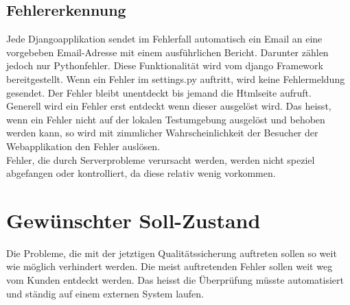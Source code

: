 \subsection{Fehlererkennung}
Jede Djangoapplikation sendet im Fehlerfall automatisch ein Email an eine vorgebeben Email-Adresse mit einem ausführlichen Bericht. Darunter zählen jedoch nur Pythonfehler. Diese Funktionalität wird vom django Framework bereitgestellt. Wenn ein Fehler im settings.py auftritt, wird keine Fehlermeldung gesendet. Der Fehler bleibt unentdeckt bis jemand die Htmlseite aufruft. \\
Generell wird ein Fehler erst entdeckt wenn dieser ausgelöst wird. Das heisst, wenn ein Fehler nicht auf der lokalen Testumgebung ausgelöst und behoben werden kann, so wird mit zimmlicher Wahrscheinlichkeit der Besucher der Webapplikation den Fehler auslösen. \\
Fehler, die durch Serverprobleme verursacht werden, werden nicht speziel abgefangen oder kontrolliert, da diese relativ wenig vorkommen. 

\section{Gewünschter Soll-Zustand}
Die Probleme, die mit der jetztigen Qualitätssicherung auftreten sollen so weit wie möglich verhindert werden. Die meist auftretenden Fehler sollen weit weg vom Kunden entdeckt werden. Das heisst die Überprüfung müsste automatisiert und ständig auf einem externen System laufen.
\clearpage
